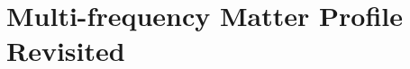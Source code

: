 





\section{\label{chap:matter-subsec:multi-frequency-revisited}Multi-frequency Matter Profile Revisited}


